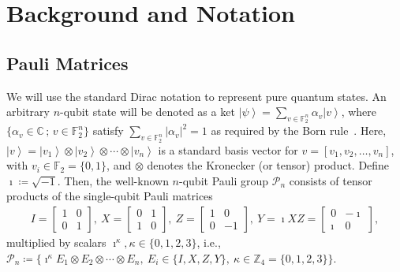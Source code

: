 \documentclass[journal,onecolumn]{IEEEtran}
\newcommand{\dket}[1]{\left\lvert #1 \right\rangle}
\newif\ifnotes
\newcommand{\narayanan}[1]{\ifnotes{{\color{blue} [Narayanan: #1]}}\fi}
\begin{document}
\section{Background and Notation}
\label{sec:background}


\subsection{Pauli Matrices}
\label{sec:paulis}

We will use the standard Dirac notation to represent pure quantum states. 
An arbitrary $n$-qubit state will be denoted as a ket $\dket{\psi} = \sum_{v \in \mathbb{F}_2^n} \alpha_v \dket{v}$, where $\{ \alpha_v \in \mathbb{C}\, ; \, v \in \mathbb{F}_2^n \}$ satisfy $\sum_{v \in \mathbb{F}_2^n} |\alpha_v|^2 = 1$ as required by the Born rule~\cite{Wilde-2013}.
Here, $\dket{v} = \dket{v_1} \otimes \dket{v_2} \otimes \cdots \otimes \dket{v_n}$ is a standard basis vector for $v = [v_1,v_2,\ldots,v_n]$, with $v_i \in \mathbb{F}_2 = \{0,1\}$, and $\otimes$ denotes the Kronecker (or tensor) product.
Define $\imath \coloneqq \sqrt{-1}$.
Then, the well-known $n$-qubit Pauli group $\mathcal{P}_n$ consists of tensor products of the single-qubit Pauli matrices
\begin{align}
I = 
\begin{bmatrix}
1 & 0 \\ 0 & 1
\end{bmatrix}, \ 
X = 
\begin{bmatrix}
0 & 1 \\ 1 & 0
\end{bmatrix}, \ 
Z = 
\begin{bmatrix}
1 & 0 \\ 0 & -1
\end{bmatrix}, \ 
Y = \imath XZ =
\begin{bmatrix}
0 & -\imath \\ \imath & 0
\end{bmatrix},
\end{align}
multiplied by scalars $\imath^\kappa, \kappa \in \{0,1,2,3\}$, i.e., 
$\mathcal{P}_n \coloneqq \{ \imath^\kappa E_1 \otimes E_2 \otimes \cdots \otimes E_n, \ E_i \in \{I,X,Z,Y\}, \ \kappa \in \mathbb{Z}_4 = \{0,1,2,3\} \}$.
\end{document}
